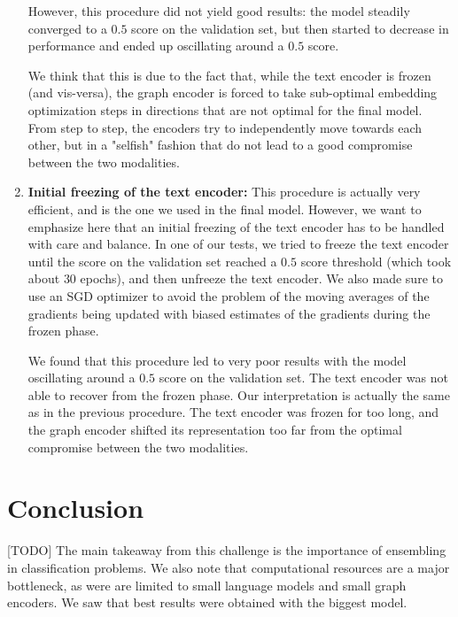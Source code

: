 \documentclass[switch, 11pt]{article}
\begin{document}
\begin{multicols}{2}
\begin{enumerate}
              However, this procedure did not yield good results: the model steadily converged to a $0.5$ score on the validation set, but then started to decrease in performance and ended up oscillating around a $0.5$ score.

              We think that this is due to the fact that, while the text encoder is frozen (and vis-versa), the graph encoder is forced to take sub-optimal embedding optimization steps in directions that are not optimal for the final model. From step to step, the encoders try to independently move towards each other, but in a "selfish" fashion that do not lead to a good compromise between the two modalities.
        \item \textbf{Initial freezing of the text encoder: } This procedure is actually very efficient, and is the one we used in the final model. However, we want to emphasize here that an initial freezing of the text encoder has to be handled with care and balance. In one of our tests, we tried to freeze the text encoder until the score on the validation set reached a $0.5$ score threshold (which took about $30$ epochs), and then unfreeze the text encoder. We also made sure to use an SGD optimizer to avoid the problem of the moving averages of the gradients being updated with biased estimates of the gradients during the frozen phase.

              We found that this procedure led to very poor results with the model oscillating around a $0.5$ score on the validation set. The text encoder was not able to recover from the frozen phase. Our interpretation is actually the same as in the previous procedure. The text encoder was frozen for too long, and the graph encoder shifted its representation too far from the optimal compromise between the two modalities.

    \end{enumerate}

    \section{Conclusion}

     [TODO] The main takeaway from this challenge is the importance of ensembling in classification problems. We also note that computational resources are a major bottleneck, as were are limited to small language models and small graph encoders. We saw that best results were obtained with the biggest model.
    \newpage

    

\end{multicols}
\end{document}
